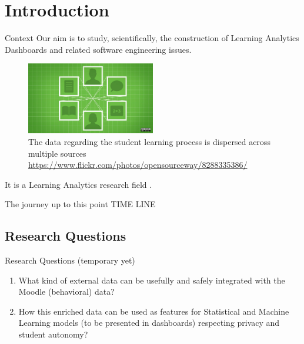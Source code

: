 \section{Introduction}

\begin{frame}{Context}
    Our aim is to study, scientifically, the construction of Learning Analytics Dashboards and related software engineering issues.

    \begin{figure}[H]
        \centering
        \label{fig:digital_learning}
        \includegraphics[width=0.5\textwidth]{../../images/digital_learning.jpg}
        \\ \small The data regarding the student learning process is dispersed across multiple sources
        \\ \small \url{https://www.flickr.com/photos/opensourceway/8288335386/}
    \end{figure}

    It is a Learning Analytics research field \cite{lang2017handbook}.
\end{frame}


\begin{frame}{The journey up to this point}
   TIME LINE
\end{frame}

\subsection{Research Questions}
\begin{frame}{Research Questions (temporary yet)}
    \begin{enumerate}[<+-|alert@+>]\color{gray}
        \item What kind of external data can be usefully and safely integrated with 
              the Moodle (behavioral) data?
        \item How this enriched data can be used as features for Statistical and 
              Machine Learning models (to be presented in dashboards) respecting privacy and student autonomy?
    \end{enumerate}
\end{frame}

